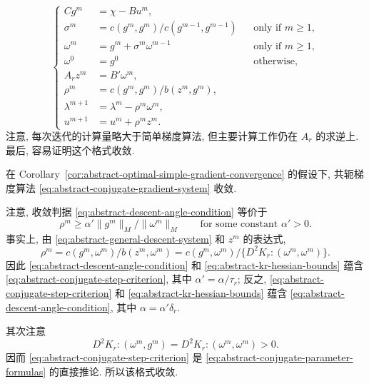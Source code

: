 \begin{equation}\label{eq:abstract-conjugate-gradient-system}
\left\{
\begin{aligned}
Cg^m&=\chi-Bu^m,\\
\sigma^m&=c(g^m,g^m)/c(g^{m-1},g^{m-1})
&&\text{only if }m\ge1,\\
\omega^m&=g^m+\sigma^m\omega^{m-1}
&&\text{only if }m\ge1,\\
\omega^0&=g^0&&\text{otherwise},\\
A_rz^m&=B'\omega^m,\\
\rho^m&=c(g^m,g^m)/b(z^m,g^m),\\
\lambda^{m+1}&=\lambda^m-\rho^m\omega^m,\\
u^{m+1}&=u^m+\rho^mz^m.
\end{aligned}
\right.
\end{equation}
注意, 每次迭代的计算量略大于简单梯度算法,
但主要计算工作仍在 $A_r$ 的求逆上.
最后, 容易证明这个格式收敛.

\setcounter{statement}{5}
\begin{Corollary}\label{cor:abstract-conjugate-gradient-convergence}
在 Corollary~\ref{cor:abstract-optimal-simple-gradient-convergence} 的假设下,
共轭梯度算法 
\eqref{eq:abstract-conjugate-gradient-system} 收敛.
\end{Corollary}
\begin{Proof}
注意, 收敛判据 
\eqref{eq:abstract-descent-angle-condition} 等价于
\begin{equation}\label{eq:abstract-conjugate-step-criterion}
\rho^m\ge\alpha'\|g^m\|_M/\|\omega^m\|_M
\qquad\text{for some constant }\alpha'>0.
\end{equation}
事实上, 由 
\eqref{eq:abstract-general-descent-system} 和 $z^m$ 的表达式,
\[
\rho^m
=c(g^m,\omega^m)/b(z^m,\omega^m)
=c(g^m,\omega^m)/
\{D^2K_r\mathbin{:}(\omega^m,\omega^m)\}.
\]
因此 
\eqref{eq:abstract-descent-angle-condition} 和
\eqref{eq:abstract-kr-hessian-bounds} 蕴含
\eqref{eq:abstract-conjugate-step-criterion}, 其中 $\alpha'=\alpha/\tau_r$;
反之, 
\eqref{eq:abstract-conjugate-step-criterion} 和
\eqref{eq:abstract-kr-hessian-bounds} 蕴含
\eqref{eq:abstract-descent-angle-condition}, 其中 $\alpha=\alpha'\delta_r$.

其次注意
\[
D^2K_r\mathbin{:}(\omega^m,g^m)
=D^2K_r\mathbin{:}(\omega^m,\omega^m)>0.
\]
因而 
\eqref{eq:abstract-conjugate-step-criterion} 是
\eqref{eq:abstract-conjugate-parameter-formulas} 的直接推论.
所以该格式收敛.
\end{Proof}
